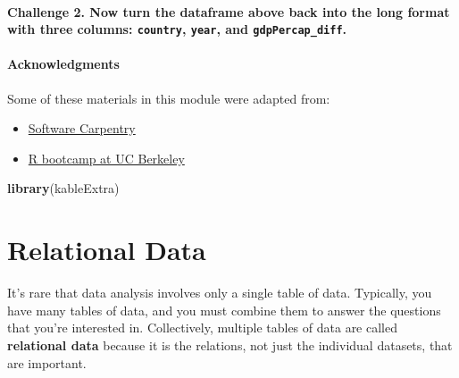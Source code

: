 \documentclass[]{book}
\newenvironment{Shaded}{\begin{snugshade}}{\end{snugshade}}
\newcommand{\KeywordTok}[1]{\textcolor[rgb]{0.13,0.29,0.53}{\textbf{#1}}}
\newcommand{\NormalTok}[1]{#1}
\providecommand{\tightlist}{%
  \setlength{\itemsep}{0pt}\setlength{\parskip}{0pt}}
\begin{document}
\subsubsection*{\texorpdfstring{Challenge 2. Now turn the dataframe
above back into the long format with three columns: \texttt{country},
\texttt{year}, and
\texttt{gdpPercap\_diff}.}{Challenge 2. Now turn the dataframe above back into the long format with three columns: country, year, and gdpPercap\_diff.}}\label{challenge-2.-now-turn-the-dataframe-above-back-into-the-long-format-with-three-columns-country-year-and-gdppercap_diff.}

\subsubsection*{Acknowledgments}\label{acknowledgments-4}

Some of these materials in this module were adapted from:

\begin{itemize}
\tightlist
\item
  \href{http://swcarpentry.github.io/r-novice-gapminder/}{Software
  Carpentry}
\item
  \href{https://github.com/berkeley-scf/r-bootcamp-fall-2019}{R bootcamp
  at UC Berkeley}
\end{itemize}

\begin{Shaded}
\begin{Highlighting}[]
\KeywordTok{library}\NormalTok{(kableExtra)}
\end{Highlighting}
\end{Shaded}

\chapter{Relational Data}\label{relational-data-1}

It's rare that data analysis involves only a single table of data.
Typically, you have many tables of data, and you must combine them to
answer the questions that you're interested in. Collectively, multiple
tables of data are called \textbf{relational data} because it is the
relations, not just the individual datasets, that are important.
\end{document}
